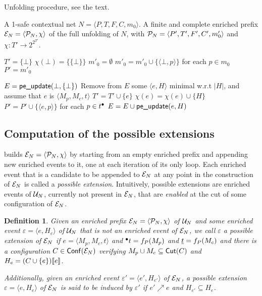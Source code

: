 \documentclass[11pt,a4paper]{article}
\newtheorem{definition}{Definition}
\newcommand{\conf}[1]{\ensuremath{\mathsf{Conf}(#1)}}
\newcommand{\peupdate}{\mbox{\sf pe\_update}}
\newcommand{\iscutoff}{\mbox{\sf is\_cutoff}}
\begin{document}
\begin{algorithm}[b]
\caption{Unfolding procedure, see the text.}
\label{alg:unfolding.procedure}

\begin{algorithmic}
\REQUIRE A 1-safe contextual net $N = \langle P, T, F, C, m_0 \rangle$.
\ENSURE A finite and complete enriched prefix $\mathcal{E}_{N} = \langle \mathcal{P}_{N}, \chi
\rangle$ of the full unfolding of $N$, with $\mathcal{P}_{N} = \langle P', T', F', C',
m'_0 \rangle$ and $\chi : T' \to 2^{2^{T'}}$.

\vspace{1ex}
\STATE $T' = \{\bot\}$
\STATE $\chi (\bot) = \{\{\bot\}\}$
\STATE $m'_0 = \emptyset$
\STATE $m'_0 = m'_0 \cup \{\langle \bot, p \rangle\}$ for each $p \in m_0$
\STATE $P' = m'_0$

\STATE $E = \peupdate (\bot, \{\bot\})$
\STATE Remove from $E$ some $\langle e, H \rangle$ minimal w.r.t $|H|$, and
assume that $e$ is $\langle M_p, M_c, t \rangle$
\IF{not $\iscutoff (e, H)$}
\STATE $T' = T' \cup \{e\}$
\STATE $\chi(e) = \chi(e) \cup \{H\}$
\STATE $P' = P' \cup \{\langle e, p \rangle\}$ for each $p \in t^\bullet$
\STATE $E = E \cup \peupdate (e, H)$
\ENDIF
\ENDWHILE
\end{algorithmic}
\end{algorithm}

\subsection{Computation of the possible extensions}
\label{sec:computation.possible}

 builds $\mathcal{E}_{N} = \langle \mathcal{P}_{N}, \chi \rangle$ by
starting from an empty enriched prefix and appending new enriched events to it,
one at each iteration of its only loop.  Each enriched event that is a
candidate to be appended to $\mathcal{E}_{N}$ at any point in the construction of $\mathcal{E}_{N}$ is called a \emph{possible extension}.  Intuitively, possible extensions are
enriched events of $\mathcal{U}_{N}$, currently not present in $\mathcal{E}_{N}$, that are
\emph{enabled} at the cut of some configuration of $\mathcal{E}_{N}$.


\begin{definition}
\label{def:possible.extension}
Given an enriched prefix $\mathcal{E}_{N} = \langle \mathcal{P}_{N}, \chi \rangle$ of $\mathcal{U}_{N}$
and some enriched event $\varepsilon = \langle e, H_e \rangle$ of $\mathcal{U}_{N}$ that
is not an enriched event of $\mathcal{E}_{N}$, we call $\varepsilon$ a \emph{possible
extension} of $\mathcal{E}_{N}$ if $e = \langle M_p, M_c, t \rangle$ and ${}^\bullet t = f_P
(M_p)$ and $\underline{t} = f_P (M_c)$ and there is a configuration $C \in \conf{\enr
N}$ verifying $M_p \cup M_c \subseteq \mathsf{Cut }{(C)}$ and $H_e = (C \cup \{e\}) [\![ e]\!]$.

Additionally, given an enriched event $\varepsilon' = \langle e', H_{e'}
\rangle$ of $\mathcal{E}_{N}$, a possible extension $\varepsilon = \langle e, H_e
\rangle$ of $\mathcal{E}_{N}$ is said to be \emph{induced by} $\varepsilon'$ if $e'
\nearrow e$ and $H_{e'} \subseteq H_e$.
\end{definition}
\end{document}
